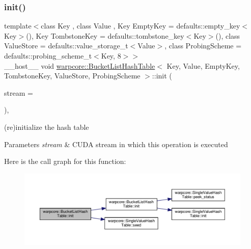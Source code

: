 \subsubsection{\texorpdfstring{init()}{init()}\hspace{0.1cm}{\footnotesize\ttfamily [2/2]}}
{\footnotesize\ttfamily template$<$class Key , class Value , Key Empty\+Key = defaults\+::empty\+\_\+key$<$\+Key$>$(), Key Tombstone\+Key = defaults\+::tombstone\+\_\+key$<$\+Key$>$(), class Value\+Store  = defaults\+::value\+\_\+storage\+\_\+t$<$\+Value$>$, class Probing\+Scheme  = defaults\+::probing\+\_\+scheme\+\_\+t$<$\+Key, 8$>$$>$ \\
\+\_\+\+\_\+host\+\_\+\+\_\+ void \hyperlink{classwarpcore_1_1BucketListHashTable}{warpcore\+::\+Bucket\+List\+Hash\+Table}$<$ Key, Value, Empty\+Key, Tombstone\+Key, Value\+Store, Probing\+Scheme $>$\+::init (\begin{DoxyParamCaption}\item[{const cuda\+Stream\+\_\+t}]{stream = {} }\end{DoxyParamCaption})\hspace{0.3cm}{\ttfamily [inline]}, {\ttfamily [noexcept]}}



(re)initialize the hash table 


\begin{DoxyParams}{Parameters}
{\em stream} & C\+U\+DA stream in which this operation is executed \\
\hline
\end{DoxyParams}
Here is the call graph for this function\+:
\nopagebreak
\begin{figure}[H]
\begin{center}
\leavevmode
\includegraphics[width=350pt]{classwarpcore_1_1BucketListHashTable_ad8b42b071bdf053a1ccd42b001212fc6_cgraph}
\end{center}
\end{figure}
\mbox{\label{classwarpcore_1_1BucketListHashTable_afd7403fb1e7a22bdf59b7f6143c1f420}} 
